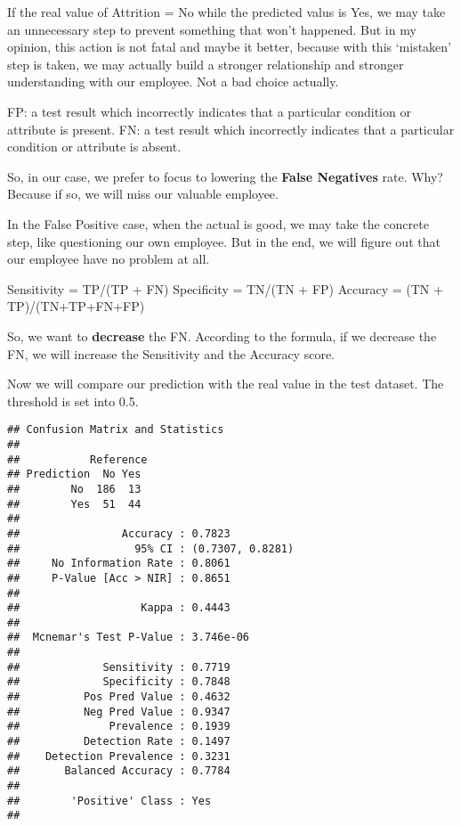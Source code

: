 \documentclass[
]{article}
\newenvironment{Shaded}{\begin{snugshade}}{\end{snugshade}}
\newcommand{\DataTypeTok}[1]{\textcolor[rgb]{0.13,0.29,0.53}{#1}}
\newcommand{\FloatTok}[1]{\textcolor[rgb]{0.00,0.00,0.81}{#1}}
\newcommand{\KeywordTok}[1]{\textcolor[rgb]{0.13,0.29,0.53}{\textbf{#1}}}
\newcommand{\NormalTok}[1]{#1}
\newcommand{\OperatorTok}[1]{\textcolor[rgb]{0.81,0.36,0.00}{\textbf{#1}}}
\newcommand{\StringTok}[1]{\textcolor[rgb]{0.31,0.60,0.02}{#1}}
\begin{document}
If the real value of Attrition = No while the predicted valus is Yes, we
may take an unnecessary step to prevent something that won't happened.
But in my opinion, this action is not fatal and maybe it better, because
with this `mistaken' step is taken, we may actually build a stronger
relationship and stronger understanding with our employee. Not a bad
choice actually.

FP: a test result which incorrectly indicates that a particular
condition or attribute is present. FN: a test result which incorrectly
indicates that a particular condition or attribute is absent.

So, in our case, we prefer to focus to lowering the \textbf{False
Negatives} rate. Why? Because if so, we will miss our valuable employee.

In the False Positive case, when the actual is good, we may take the
concrete step, like questioning our own employee. But in the end, we
will figure out that our employee have no problem at all.

Sensitivity = TP/(TP + FN) Specificity = TN/(TN + FP) Accuracy = (TN +
TP)/(TN+TP+FN+FP)

So, we want to \textbf{decrease} the FN. According to the formula, if we
decrease the FN, we will increase the Sensitivity and the Accuracy
score.

Now we will compare our prediction with the real value in the test
dataset. The threshold is set into 0.5.

\begin{Shaded}
\end{Shaded}

\begin{verbatim}
## Confusion Matrix and Statistics
## 
##           Reference
## Prediction  No Yes
##        No  186  13
##        Yes  51  44
##                                           
##                Accuracy : 0.7823          
##                  95% CI : (0.7307, 0.8281)
##     No Information Rate : 0.8061          
##     P-Value [Acc > NIR] : 0.8651          
##                                           
##                   Kappa : 0.4443          
##                                           
##  Mcnemar's Test P-Value : 3.746e-06       
##                                           
##             Sensitivity : 0.7719          
##             Specificity : 0.7848          
##          Pos Pred Value : 0.4632          
##          Neg Pred Value : 0.9347          
##              Prevalence : 0.1939          
##          Detection Rate : 0.1497          
##    Detection Prevalence : 0.3231          
##       Balanced Accuracy : 0.7784          
##                                           
##        'Positive' Class : Yes             
## 
\end{verbatim}
\end{document}

